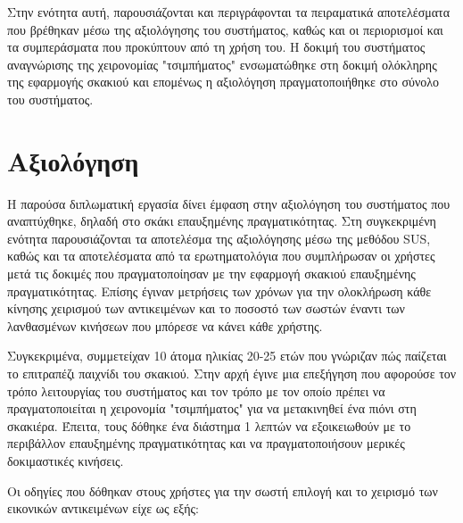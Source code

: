 


Στην ενότητα αυτή, παρουσιάζονται και περιγράφονται τα πειραματικά αποτελέσματα που βρέθηκαν μέσω της αξιολόγησης του συστήματος, καθώς και οι περιορισμοί και τα συμπεράσματα που προκύπτουν από τη χρήση του. Η δοκιμή του συστήματος αναγνώρισης της χειρονομίας "τσιμπήματος" ενσωματώθηκε στη δοκιμή ολόκληρης της εφαρμογής σκακιού και επομένως η αξιολόγηση πραγματοποιήθηκε στο σύνολο του συστήματος.





\section{Αξιολόγηση}



Η παρούσα διπλωματική εργασία δίνει έμφαση στην αξιολόγηση του συστήματος που αναπτύχθηκε, δηλαδή στο σκάκι επαυξημένης πραγματικότητας.
Στη συγκεκριμένη ενότητα παρουσιάζονται τα αποτελέσμα της αξιολόγησης μέσω της μεθόδου SUS, καθώς και τα αποτελέσματα από τα ερωτηματολόγια που συμπλήρωσαν οι χρήστες μετά τις δοκιμές που πραγματοποίησαν με την εφαρμογή σκακιού επαυξημένης πραγματικότητας. Επίσης έγιναν μετρήσεις των χρόνων για την ολοκλήρωση κάθε κίνησης χειρισμού των αντικειμένων και το ποσοστό των σωστών έναντι των λανθασμένων κινήσεων που μπόρεσε να κάνει κάθε χρήστης.


Συγκεκριμένα, συμμετείχαν 10 άτομα ηλικίας 20-25 ετών που γνώριζαν πώς παίζεται το επιτραπέζι παιχνίδι του σκακιού. Στην αρχή έγινε μια επεξήγηση που αφορούσε τον τρόπο λειτουργίας του συστήματος και τον τρόπο με τον οποίο πρέπει να πραγματοποιείται η χειρονομία "τσιμπήματος" για να μετακινηθεί ένα πιόνι στη σκακιέρα. Έπειτα, τους δόθηκε ένα διάστημα 1 λεπτών να εξοικειωθούν με το περιβάλλον επαυξημένης πραγματικότητας και να πραγματοποιήσουν μερικές δοκιμαστικές κινήσεις.

Οι οδηγίες που δόθηκαν στους χρήστες για την σωστή επιλογή και το χειρισμό των εικονικών αντικειμένων είχε ως εξής:

